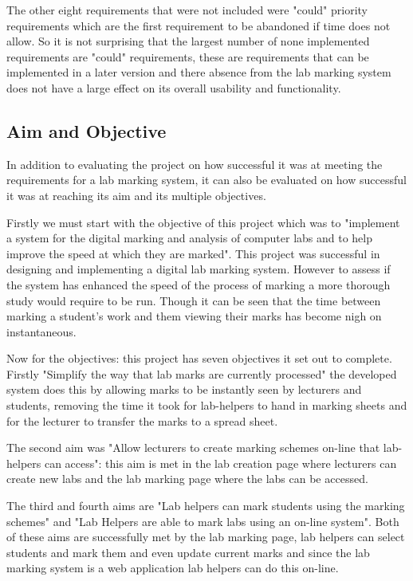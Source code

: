 \documentclass[12pt]{article}  %
\begin{document}
The other eight requirements that were not included were "could" priority requirements which are the first requirement to be abandoned if time does not allow. So it is not surprising that the largest number of none implemented requirements are "could" requirements, these are requirements that can be implemented in a later version and there absence from the lab marking system does not have a large effect on its overall usability and functionality.


\subsection{Aim and Objective}

In addition to evaluating the project on how successful it was at meeting the requirements for a lab marking system, it can also be evaluated on how successful it was at reaching its aim and its multiple objectives.

Firstly we must start with the objective of this project which was to "implement  a  system  for  the  digital  marking  and analysis of computer labs and to help improve the speed at which they are marked". This project was successful in designing and implementing a digital lab marking system. However to assess if the system has enhanced the speed of the process of marking a more thorough study would require to be run. Though it can be seen that the time between marking a student's work and them viewing their marks has become nigh on instantaneous.

Now for the objectives: this project has seven objectives it set out to complete. Firstly "Simplify the way that lab marks are currently processed" the developed system does this by allowing marks to be instantly seen by lecturers and students, removing the time it took for lab-helpers to hand in marking  sheets and for the lecturer to transfer the marks to a spread sheet.

The second aim was "Allow lecturers to create marking schemes on-line that lab-helpers can access": this aim is met in the lab creation page where lecturers can create new labs and the lab marking page where the labs can be accessed.

The third and fourth aims are "Lab helpers can mark students using the marking schemes" and "Lab Helpers are able to mark labs using an on-line system". Both of these aims are successfully met by the lab marking page, lab helpers can select students and mark them and even update current marks and since the lab marking system is a web application lab helpers can do this on-line.
\end{document}
